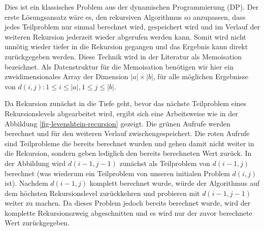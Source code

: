 \documentclass{whswinvcbook}
\begin{document}
Dies ist ein klassisches Problem aus der dynamischen Programmierung (DP). Der erste Lösungsansatz wäre es, den rekursiven Algorithmus so anzupassen, dass jedes Teilproblem nur einmal berechnet wird, gespeichert wird und im Verlauf der weiteren Rekursion jederzeit wieder abgerufen werden kann. Somit wird nicht unnötig wieder tiefer in die Rekursion gegangen und das Ergebnis kann direkt zurückgegeben werden. Diese Technik wird in der Literatur als Memoisation bezeichnet. Als Datenstruktur für die Memoisation benötigen wir hier ein zweidimensionales Array der Dimension $|a|\times |b|$, für alle möglichen Ergebnisse von $d(i,j):1\leq i\leq|a|,1\leq j\leq|b|$.

Da Rekursion zunächst in die Tiefe geht, bevor das nächste Teilproblem eines Rekursionslevels abgearbeitet wird, ergibt sich eine Arbeitsweise wie in der Abbildung \ref{fig-levenshtein-recursion} gezeigt. Die grünen Aufrufe werden berechnet und für den weiteren Verlauf zwischengespeichert. Die roten Aufrufe sind Teilprobleme die bereits berechnet wurden und gehen damit nicht weiter in die Rekursion, sondern geben lediglich den bereits berechneten Wert zurück. In der Abbildung wird $d(i-1,j-1)$ zunächst als Teilproblem von $d(i-1,j)$ berechnet (was wiederum ein Teilproblem von unseren initialen Problem $d(i,j)$ ist). Nachdem $d(i-1,j)$ komplett berechnet wurde, würde der Algorithmus auf dem höchsten Rekursionslevel zurückkehren und probieren mit $d(i-1,j-1)$ weiter zu machen. Da dieses Problem jedoch bereits berechnet wurde, wird der komplette Rekursionszweig abgeschnitten und es wird nur der zuvor berechnete Wert zurückgegeben.
\end{document}
